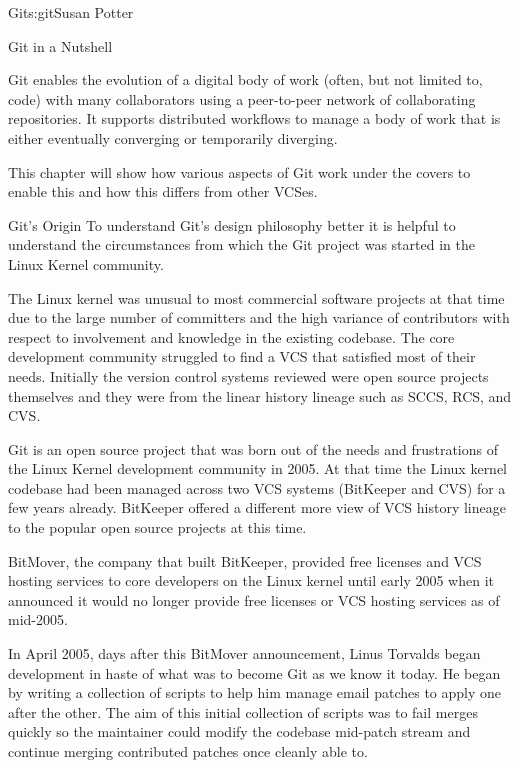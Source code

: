 \begin{aosachapter}{Git}{s:git}{Susan Potter}

\begin{aosasect1}{Git in a Nutshell}

Git enables the evolution of a digital body of work (often,
but not limited to, code) with many collaborators
using a peer-to-peer network of collaborating repositories. It
supports distributed workflows to manage a body of work that is
either eventually converging or temporarily diverging.

This chapter will show how various aspects of Git work under the covers
to enable this and how this differs from other VCSes.

\end{aosasect1}

\begin{aosasect1}{Git's Origin}
To understand Git's design philosophy better it is helpful to understand the
circumstances from which the Git project was started in the Linux Kernel
community.

The Linux kernel was unusual to most commercial software projects at that
time due to the large number of committers and the high variance of
contributors with respect to involvement and knowledge in the existing
codebase. The core development community struggled to find a VCS that
satisfied most of their needs. Initially the version control systems
reviewed were open source projects themselves and they were from the linear
history lineage such as SCCS, RCS, and CVS.

Git is an open source project that was born out of the needs and
frustrations of the Linux Kernel development community in 2005. At that time
the Linux kernel codebase had been managed across two VCS systems (BitKeeper
and CVS) for a few years already. BitKeeper offered a different more
view of VCS history lineage to the popular open source projects at this
time.

BitMover, the company that built BitKeeper, provided free licenses and VCS
hosting services to core developers on the Linux kernel until early 2005
when it announced it would no longer provide free licenses or VCS hosting
services as of mid-2005.

In April 2005, days after this BitMover announcement, Linus Torvalds began
development in haste of what was to become Git as we know it today. He began
by writing a collection of scripts to help him manage email patches to apply
one after the other. The aim of this initial collection of scripts was to
fail merges quickly so the maintainer could modify the codebase mid-patch
stream and continue merging contributed patches once cleanly able to.


\end{aosasect1}
\end{aosachapter}
